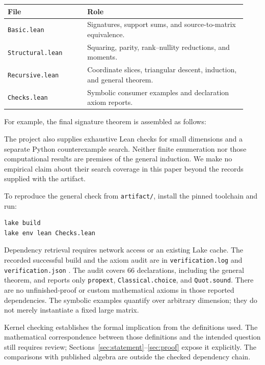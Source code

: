 \documentclass[11pt]{article}
\theoremstyle{definition}
\begin{document}
\begin{center}
\begin{tabular}{@{}p{0.31\linewidth}p{0.62\linewidth}@{}}
\toprule
File & Role \\
\midrule
\texttt{Basic.lean} & Signatures, support sums, and source-to-matrix equivalence.\\
\texttt{Structural.lean} & Squaring, parity, rank--nullity reductions, and moments.\\
\texttt{Recursive.lean} & Coordinate slices, triangular descent, induction, and general theorem.\\
\texttt{Checks.lean} & Symbolic consumer examples and declaration axiom reports.\\
\bottomrule
\end{tabular}
\end{center}

For example, the final signature theorem is assembled as follows:

The project also supplies exhaustive Lean checks for small dimensions and a separate Python counterexample search. Neither finite enumeration nor those computational results are premises of the general induction. We make no empirical claim about their search coverage in this paper beyond the records supplied with the artifact.

To reproduce the general check from \texttt{artifact/}, install the pinned toolchain and run:
\begin{lstlisting}[numbers=none]
lake build
lake env lean Checks.lean
\end{lstlisting}
Dependency retrieval requires network access or an existing Lake cache. The recorded successful build and the axiom audit are in \texttt{verification.log} and \texttt{verification.json} \cite{artifact}. The audit covers 66 declarations, including the general theorem, and reports only \texttt{propext}, \texttt{Classical.choice}, and \texttt{Quot.sound}. There are no unfinished-proof or custom mathematical axioms in those reported dependencies. The symbolic examples quantify over arbitrary dimension; they do not merely instantiate a fixed large matrix.

Kernel checking establishes the formal implication from the definitions used. The mathematical correspondence between those definitions and the intended question still requires review; Sections~\ref{sec:statement}--\ref{sec:proof} expose it explicitly. The comparisons with published algebra are outside the checked dependency chain.
\end{document}
